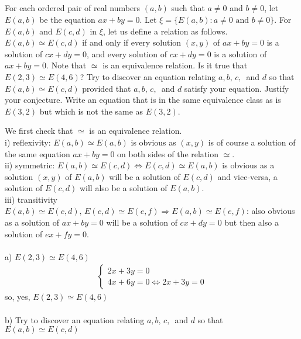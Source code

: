 \subsection{}
\begin{tcolorbox}
For each ordered pair of real numbers $(a, b)$ such that $a\neq 0$ and $b\neq 0$, let $E(a, b)$ be the equation $ax+ by = 0$. Let $\xi= \{E(a, b):a\neq 0 \text{ and } b\neq 0\}$. For $E(a, b)$ and $E(c, d)$ in $\xi$, let us define a relation as follows. $E(a, b) \simeq  E(c, d)$ if and only if every solution $(x,y)$ of $ax+ by = 0$ is a solution of $cx + dy = 0$, and every solution of $cx+ dy = 0$ is a solution of $ax + by = 0$. Note that $\simeq$  is an equivalence relation. Is it true that $E(2, 3)\simeq E(4, 6)$? Try to discover an equation relating $a, b,\, c, \,$ and $d$ so that $E(a,b)\simeq E(c, d) $ provided that $a, b,\, c, \,$ and $d$  satisfy your equation. Justify your conjecture. Write an equation that is in the same equivalence class as is $E(3, 2)$ but which is not the same as $E(3, 2)$. 

\end{tcolorbox}
$$ $$
We first check that $\simeq$ is an equivalence relation.\\
i) reflexivity: $E(a,b)\simeq E(a,b)$ is obvious as $(x,y)$ is of course  a solution of the same equation $ax+by=0$ on both sides of the relation $\simeq$.\\
ii) symmetric: $E(a,b)\simeq E(c,d)\Leftrightarrow E(c,d)\simeq E(a,b)$ is obvious as a solution $(x,y)$ of $E(a,b)$ will be a solution of $E(c,d)$ and vice-versa, a solution of  $E(c,d)$ will also be a solution of $E(a,b)$.\\
iii) transitivity $E(a,b)\simeq E(c,d),\,E(c,d)\simeq E(e,f) \Rightarrow E(a,b)\simeq E(e,f)$: also obvious as a solution of $ax+by=0$ will be a solution of $cx+dy=0$ but then also a solution of $ex+fy=0$.\\\\
a) $E(2,3) \simeq E(4,6)$\\
\begin{align*}
\left\{\begin{array}{l}
2x+3y=0\\
4x+6y=0\Leftrightarrow 2x+3y=0
\end{array}\right.
\end{align*}
so, yes,  $E(2,3) \simeq E(4,6)$\\\\
b) Try to discover an equation relating $a, b,\, c, \,$ and $d$ so that $E(a,b)\simeq E(c, d) $\\\\
